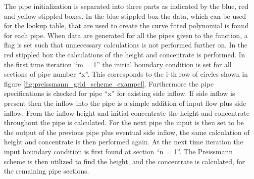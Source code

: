 The pipe initialization is separated into three parts as indicated by the blue, red and yellow stippled boxes. In the blue stippled box the data, which can be used for the lookup table, that are used to create the curve fitted polynomial is found for each pipe. When data are generated for all the pipes given to the function, a flag is set such that unnecessary calculations is not performed further on. In the red stippled box the calculations of the height and concentrate is performed. In the first time iteration ``m = 1'' the initial boundary condition is set for all sections of pipe number ``x''. This corresponds to the i-th row of circles shown in figure \ref{fig:preissmann_grid_scheme_exampel}. Furthermore the pipe specifications is checked for pipe ``x'' for existing side inflow. If side inflow is present then the inflow into the pipe is a simple addition of input flow plus side inflow. From the inflow height and initial concentrate the height and concentrate throughout the pipe is calculated. 
For the next pipe the input is then set to be the output of the previous pipe plus eventual side inflow, the same calculation of height and concentrate is then performed again.
At the next time iteration the input boundary condition is first found at section ``n = 1''. The Preissmann scheme is then utilized to find the height, and the concentrate is calculated, for the remaining pipe sections.  